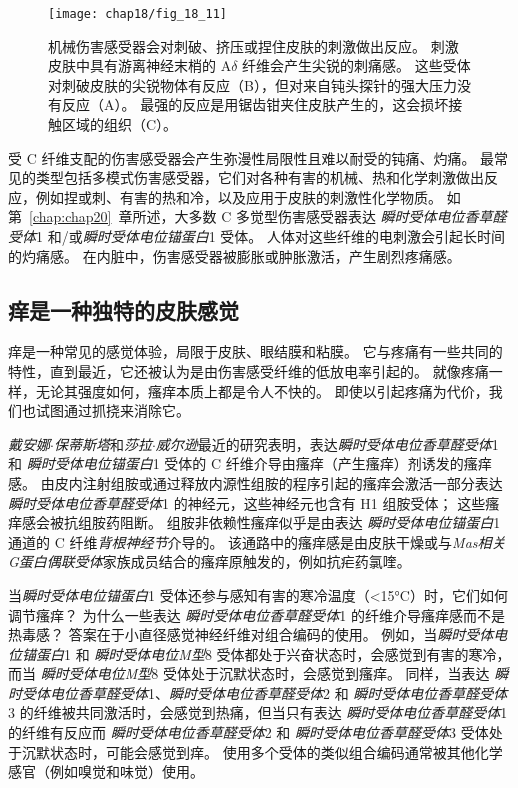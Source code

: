 \begin{figure}[htbp]
	\centering
	\texttt{[image: chap18/fig\_18\_11]}
	\caption{机械伤害感受器会对刺破、挤压或捏住皮肤的刺激做出反应。
		刺激皮肤中具有游离神经末梢的 A$\delta$ 纤维会产生尖锐的刺痛感。
		这些受体对刺破皮肤的尖锐物体有反应（B），但对来自钝头探针的强大压力没有反应（A）。
		最强的反应是用锯齿钳夹住皮肤产生的，这会损坏接触区域的组织（C）\cite{perl1968myelinated}。}
	\label{fig:18_11}
\end{figure}


受 C 纤维支配的伤害感受器会产生弥漫性局限性且难以耐受的钝痛、灼痛。
最常见的类型包括多模式伤害感受器，它们对各种有害的机械、热和化学刺激做出反应，例如捏或刺、有害的热和冷，以及应用于皮肤的刺激性化学物质。
如第~\ref{chap:chap20}~章所述，大多数 C 多觉型伤害感受器表达 \textit{瞬时受体电位香草醛受体}1 和/或\textit{瞬时受体电位锚蛋白}1 受体。
人体对这些纤维的电刺激会引起长时间的灼痛感。
在内脏中，伤害感受器被膨胀或肿胀激活，产生剧烈疼痛感。


\subsection{痒是一种独特的皮肤感觉}

痒是一种常见的感觉体验，局限于皮肤、眼结膜和粘膜。 
它与疼痛有一些共同的特性，直到最近，它还被认为是由伤害感受纤维的低放电率引起的。
就像疼痛一样，无论其强度如何，瘙痒本质上都是令人不快的。
即使以引起疼痛为代价，我们也试图通过抓挠来消除它。


\textit{戴安娜$\cdot$保蒂斯塔}和\textit{莎拉$\cdot$威尔逊}最近的研究表明，表达\textit{瞬时受体电位香草醛受体}1 和 \textit{瞬时受体电位锚蛋白}1 受体的 C 纤维介导由瘙痒（产生瘙痒）剂诱发的瘙痒感。
由皮内注射组胺或通过释放内源性组胺的程序引起的瘙痒会激活一部分表达 \textit{瞬时受体电位香草醛受体}1 的神经元，这些神经元也含有 H1 组胺受体；
这些瘙痒感会被抗组胺药阻断。
组胺非依赖性瘙痒似乎是由表达 \textit{瞬时受体电位锚蛋白}1 通道的 C 纤维\textit{背根神经节}介导的。
该通路中的瘙痒感是由皮肤干燥或与\textit{Mas相关G蛋白偶联受体}家族成员结合的瘙痒原触发的，例如抗疟药氯喹。


当\textit{瞬时受体电位锚蛋白}1 受体还参与感知有害的寒冷温度（<15°C）时，它们如何调节瘙痒？
为什么一些表达 \textit{瞬时受体电位香草醛受体}1 的纤维介导瘙痒感而不是热毒感？
答案在于小直径感觉神经纤维对组合编码的使用。
例如，当\textit{瞬时受体电位锚蛋白}1 和 \textit{瞬时受体电位M型}8 受体都处于兴奋状态时，会感觉到有害的寒冷，而当 \textit{瞬时受体电位M型}8 受体处于沉默状态时，会感觉到瘙痒。
同样，当表达 \textit{瞬时受体电位香草醛受体}1、\textit{瞬时受体电位香草醛受体}2 和 \textit{瞬时受体电位香草醛受体}3 的纤维被共同激活时，会感觉到热痛，但当只有表达 \textit{瞬时受体电位香草醛受体}1 的纤维有反应而 \textit{瞬时受体电位香草醛受体}2 和 \textit{瞬时受体电位香草醛受体}3 受体处于沉默状态时，可能会感觉到痒。
使用多个受体的类似组合编码通常被其他化学感官（例如嗅觉和味觉）使用。



